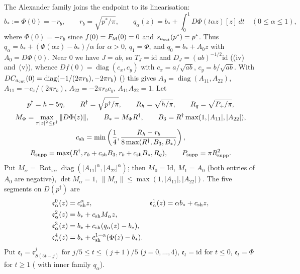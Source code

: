 The Alexander family joins the endpoint to its linearisation:
\begin{equation}\label{eq:scalar-alexander}
 b_*:=\Phi(0)=-r_b,\qquad r_b=\sqrt{p^*/\pi},\qquad
 q_\alpha(z)=b_*+\int_0^1D\Phi(t\alpha z)[z]\,dt\quad(0\le\alpha\le1),
\end{equation}
where $\Phi(0)=-r_b$ since $f(0)=F_{\rm M}(0)=0$ and $s_{a_{\rm cut}}(p^*)=p^*$. Thus $q_\alpha=b_*+(\Phi(\alpha z)-b_*)/\alpha$ for $\alpha>0$, $q_1=\Phi$, and $q_0=b_*+A_0z$ with $A_0=D\Phi(0)$. Near $0$ we have $J=ab$, so $T_J=\mathrm{id}$ and $D_J=(ab)^{-1/2}\mathrm{id}$ ((iv) and~(v)), whence $Df(0)=\operatorname{diag}(c_x,c_y)$ with $c_x=a/\sqrt{ab}$, $c_y=b/\sqrt{ab}$. With $DC_{a_{\rm cut}}(0)=\operatorname{diag}(-1/(2\pi r_b),-2\pi r_b)$ () this gives $A_0=\operatorname{diag}(A_{11},A_{22})$, $A_{11}=-c_x/(2\pi r_b)$, $A_{22}=-2\pi r_bc_y$, $A_{11}A_{22}=1$. Let
\begin{gather}\label{eq:scalar-path-constants}
 p^\dagger=h-5\eta,\qquad R^\dagger=\sqrt{p^\dagger/\pi},\qquad R_h=\sqrt{h/\pi},\qquad
 R_q=\sqrt{P_+/\pi},\\
 M_\Phi=\max_{\pi|z|^2\le p^\dagger}\|D\Phi(z)\|,\qquad B_*=M_\Phi R^\dagger,\qquad
 B_3=R^\dagger\max(1,|A_{11}|,|A_{22}|),\notag\\
 c_{\rm sh}=\min\left(\frac14,\frac{R_h-r_b}{8\max(R^\dagger,B_3,B_*)}\right),\notag\\
 R_{\rm supp}=\max(R^\dagger,r_b+c_{\rm sh}B_3,r_b+c_{\rm sh}B_*,R_q),\qquad
 P_{\rm supp}=\pi R_{\rm supp}^2.\notag
\end{gather}
Put $M_\alpha=\operatorname{Rot}_{\pi\alpha}\operatorname{diag}(|A_{11}|^\alpha,|A_{22}|^\alpha)$; then $M_0=\mathrm{Id}$, $M_1=A_0$ (both entries of $A_0$ are negative), $\det M_\alpha=1$, $\|M_\alpha\|\le\max(1,|A_{11}|,|A_{22}|)$. The five segments on $D(p^\dagger)$ are
\begin{equation}\label{eq:scalar-five-segments}
\begin{aligned}
 \mathfrak e^0_\alpha(z)&=c_{\rm sh}^{\alpha}z,&
 \mathfrak e^1_\alpha(z)&=\alpha b_*+c_{\rm sh}z,\\
 \mathfrak e^2_\alpha(z)&=b_*+c_{\rm sh}M_\alpha z,\\
 \mathfrak e^3_\alpha(z)&=b_*+c_{\rm sh}(q_\alpha(z)-b_*),\\
 \mathfrak e^4_\alpha(z)&=b_*+c_{\rm sh}^{1-\alpha}(\Phi(z)-b_*).
\end{aligned}
\end{equation}
Put $\mathfrak e_t=\mathfrak e^j_{S(5t-j)}$ for $j/5\le t\le(j+1)/5$ ($j=0,\dots,4$), $\mathfrak e_t=\mathrm{id}$ for $t\le0$, $\mathfrak e_t=\Phi$ for $t\ge1$ ( with inner family $q_\alpha$).

